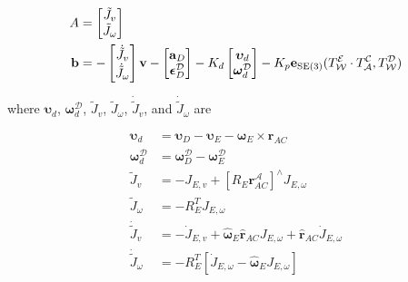 \begin{equation}
    \begin{aligned}
        A & =
        \begin{bmatrix}
            \tilde{J}_v \\
            \tilde{J}_{\omega}
        \end{bmatrix} \\
        \mathbf{b} & = 
        -\begin{bmatrix}
            \dot{\tilde{J}}_v \\
            \dot{\tilde{J}}_{\omega}
        \end{bmatrix}
        \mathbf{v}
        - \begin{bmatrix}
          \mathbf{a}_D \\
          \boldsymbol{\epsilon}_D^{\mathcal{D}}  
        \end{bmatrix}
        - K_d
        \begin{bmatrix}
            \boldsymbol{\upsilon}_d \\
            \boldsymbol{\omega}_d^{\mathcal{D}}
        \end{bmatrix}
        - K_p
        \mathbf{e}_{\text{SE}(3)}(
            T_{\mathcal{W}}^{\mathcal{E}} \cdot
            T_{\mathcal{A}}^{\mathcal{C}}, 
            T_{\mathcal{W}}^{\mathcal{D}}
        )
    \end{aligned}
    \label{eqn:a_and_b_control_rigid_b}
\end{equation}

where $\boldsymbol{\upsilon}_d$, $\boldsymbol{\omega}_d^{\mathcal{D}}$, 
$\tilde{J}_v$, $\tilde{J}_{\omega}$, $\dot{\tilde{J}}_v$, and 
$\dot{\tilde{J}}_{\omega}$ are

\begin{equation}
    \begin{aligned}
        \boldsymbol{\upsilon}_d & = \boldsymbol{\upsilon}_D - 
        \boldsymbol{\upsilon}_E - \boldsymbol{\omega}_E \times \mathbf{r}_{AC} \\
        \boldsymbol{\omega}_d^{\mathcal{D}} & = 
        \boldsymbol{\omega}_D^{\mathcal{D}} - 
        \boldsymbol{\omega}_E^{\mathcal{D}}\\
        \tilde{J}_v & = -J_{E,v} + [R_E \mathbf{r}_{AC}^{\mathcal{A}}]^{\wedge}
        J_{E, \omega} \\
        \tilde{J}_{\omega} & = - R_E^T J_{E, \omega} \\
        \dot{\tilde{J}}_v & = -\dot{J}_{E, v} + 
        \hat{\boldsymbol{\omega}}_E \hat{\mathbf{r}}_{AC} J_{E, \omega} + 
        \hat{\mathbf{r}}_{AC} \dot{J}_{E, \omega} \\
        \dot{\tilde{J}}_{\omega} & = - R_E^T [
            \dot{J}_{E, \omega} - \hat{\boldsymbol{\omega}}_E J_{E, \omega}
        ] 
    \end{aligned}
    \label{eqn:jacobians_for_rigid_control}
\end{equation}

